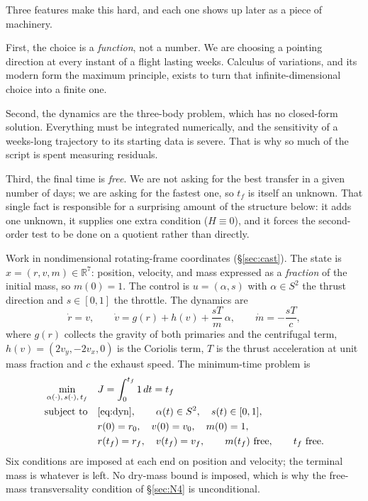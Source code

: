 \documentclass[11pt]{article}
\newcommand{\tf}{t_f}\newcommand{\R}{\mathbb{R}}
\begin{document}
\begin{intu}
Three features make this hard, and each one shows up later as a piece of
machinery.

First, the choice is a \emph{function}, not a number. We are choosing a
pointing direction at every instant of a flight lasting weeks. Calculus of
variations, and its modern form the maximum principle, exists to turn that
infinite-dimensional choice into a finite one.

Second, the dynamics are the three-body problem, which has no closed-form
solution. Everything must be integrated numerically, and the sensitivity of a
weeks-long trajectory to its starting data is severe. That is why so much of
the script is spent measuring residuals.

Third, the final time is \emph{free}. We are not asking for the best transfer
in a given number of days; we are asking for the fastest one, so $\tf$ is
itself an unknown. That single fact is responsible for a surprising amount of
the structure below: it adds one unknown, it supplies one extra condition
($H \equiv 0$), and it forces the second-order test to be done on a quotient
rather than directly.
\end{intu}

\begin{rig}
Work in nondimensional rotating-frame coordinates (\S\ref{sec:cast}). The state
is $x = (r, v, m) \in \R^7$: position, velocity, and mass expressed as a
\emph{fraction} of the initial mass, so $m(0) = 1$. The control is
$u = (\alpha, s)$ with $\alpha \in S^2$ the thrust direction and $s \in [0,1]$
the throttle. The dynamics are
\begin{equation}\label{eq:dyn}
\dot r = v, \qquad
\dot v = g(r) + h(v) + \frac{sT}{m}\,\alpha, \qquad
\dot m = -\frac{sT}{c},
\end{equation}
where $g(r)$ collects the gravity of both primaries and the centrifugal term,
$h(v) = (2v_y, -2v_x, 0)$ is the Coriolis term, $T$ is the thrust acceleration
at unit mass fraction and $c$ the exhaust speed. The minimum-time problem is
\begin{align}
\min_{\alpha(\cdot),\, s(\cdot),\, \tf} \quad & J = \int_0^{\tf} 1 \, dt = \tf
\label{eq:J}\\
\text{subject to} \quad & \eqref{eq:dyn}, \qquad \alpha(t) \in S^2, \quad s(t) \in [0,1], \notag\\
& r(0) = r_0, \quad v(0) = v_0, \quad m(0) = 1, \notag\\
& r(\tf) = r_f, \quad v(\tf) = v_f, \qquad m(\tf) \ \text{free}, \qquad \tf \ \text{free}. \notag
\end{align}
Six conditions are imposed at each end on position and velocity; the terminal
mass is whatever is left. No dry-mass bound is imposed, which is why the
free-mass transversality condition of \S\ref{sec:N4} is unconditional.
\end{rig}
\end{document}
